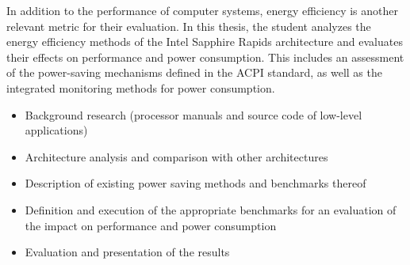 


\begin{task}[] %
	\minisec{\objectivesname}\smallskip	
In addition to the performance of computer systems, energy efficiency is another relevant metric for their evaluation. In this thesis, the student analyzes the energy efficiency methods of the Intel Sapphire Rapids architecture and evaluates their effects on performance and power consumption. This includes an assessment of the power-saving mechanisms defined in the ACPI standard, as well as the integrated monitoring methods for power consumption.
	
	\minisec{\focusname}\smallskip
	\begin{itemize}
		\item Background research (processor manuals and source code of low-level applications)
		\item Architecture analysis and comparison with other architectures
		\item Description of existing power saving methods and benchmarks thereof
		\item Definition and execution of the appropriate benchmarks for an evaluation of the impact on performance and power consumption
		\item Evaluation and presentation of the results
	\end{itemize}
\end{task}


